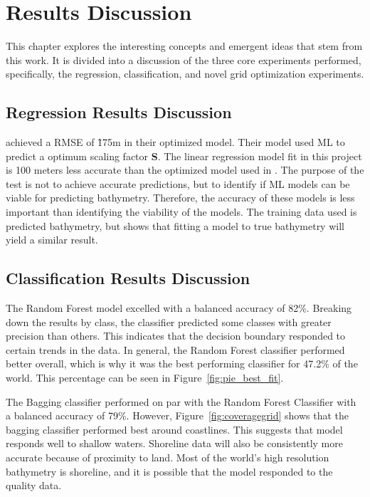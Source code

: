 \section{Results Discussion}
\label{sec:discussion}
\setlength{\parindent}{10ex}
This chapter explores the interesting concepts and emergent ideas that stem from this work.
It is divided into a discussion of the three core experiments performed, specifically, the regression, classification, and novel grid optimization experiments.

\subsection{Regression Results Discussion}
\cite{jena2012prediction} achieved a \ac{RMSE} of \~175m in their optimized model.
Their model used \ac{ML} to predict a optimum scaling factor \textbf{S}.
The linear regression model fit in this project is 100 meters less accurate than the optimized model used in \cite{jena2012prediction}.
The purpose of the test is not to achieve accurate predictions, but to identify if \ac{ML} models can be viable for predicting bathymetry.
Therefore, the accuracy of these models is less important than identifying the viability of the models.
The training data used is predicted bathymetry, but shows that fitting a model to true bathymetry will yield a similar result.

\subsection{Classification Results Discussion}
The Random Forest model excelled with a balanced accuracy of 82\%.
Breaking down the results by class, the classifier predicted some classes with greater precision than others.
This indicates that the decision boundary responded to certain trends in the data.
In general, the Random Forest classifier performed better overall, which is why it was the best performing classifier for 47.2\% of the world.
This percentage can be seen in Figure~\ref{fig:pie_best_fit}.

\par
The Bagging classifier performed on par with the Random Forest Classifier with a balanced accuracy of 79\%.
However, Figure~\ref{fig:coveragegrid} shows that the bagging classifier performed best around coastlines.
This suggests that model responds well to shallow waters.
Shoreline data will also be consistently more accurate because of proximity to land.
Most of the world's high resolution bathymetry is shoreline, and it is possible that the model responded to the quality data.


